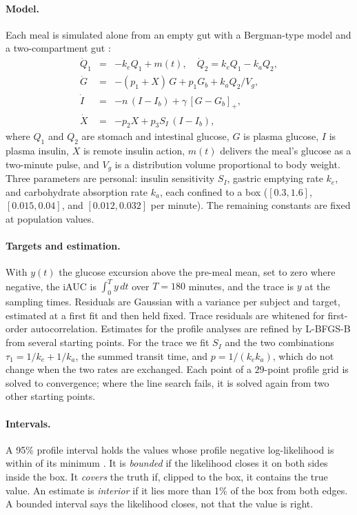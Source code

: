 \documentclass[letterpaper]{article} %
\begin{document}
\paragraph{Model.} Each meal is simulated alone from an empty gut with a Bergman-type model \citep{bergman1979} and a two-compartment gut \citep[for a fuller meal model, see][]{dallaman2007}:
\begin{eqnarray}
\dot Q_1 &=& -k_e Q_1 + m(t),\quad \dot Q_2 = k_e Q_1 - k_a Q_2,\nonumber\\
\dot G &=& -(p_1 + X)\,G + p_1 G_b + k_a Q_2 / V_g,\nonumber\\
\dot I &=& -n\,(I - I_b) + \gamma\,[G - G_b]_+,\nonumber\\
\dot X &=& -p_2 X + p_3 S_I\,(I - I_b),\nonumber
\end{eqnarray}
where $Q_1$ and $Q_2$ are stomach and intestinal glucose, $G$ is plasma glucose, $I$ is plasma insulin, $X$ is remote insulin action, $m(t)$ delivers the meal's glucose as a two-minute pulse, and $V_g$ is a distribution volume proportional to body weight. Three parameters are personal: insulin sensitivity $S_I$, gastric emptying rate $k_e$, and carbohydrate absorption rate $k_a$, each confined to a box ($[0.3,1.6]$, $[0.015,0.04]$, and $[0.012,0.032]$ per minute). The remaining constants are fixed at population values.

\paragraph{Targets and estimation.} With $y(t)$ the glucose excursion above the pre-meal mean, set to zero where negative, the iAUC is $\int_0^T y\,dt$ over $T=180$ minutes, and the trace is $y$ at the sampling times. Residuals are Gaussian with a variance per subject and target, estimated at a first fit and then held fixed. Trace residuals are whitened for first-order autocorrelation. Estimates for the profile analyses are refined by L-BFGS-B from several starting points. For the trace we fit $S_I$ and the two combinations $\tau_1=1/k_e+1/k_a$, the summed transit time, and $p=1/(k_e k_a)$, which do not change when the two rates are exchanged. Each point of a $29$-point profile grid is solved to convergence; where the line search fails, it is solved again from two other starting points.

\paragraph{Intervals.} A 95\% profile interval holds the values whose profile negative log-likelihood is within \resDeltaThreshold{} of its minimum \citep{raue2009structural}. It is \emph{bounded} if the likelihood closes it on both sides inside the box. It \emph{covers} the truth if, clipped to the box, it contains the true value. An estimate is \emph{interior} if it lies more than 1\% of the box from both edges. A bounded interval says the likelihood closes, not that the value is right.
\end{document}
